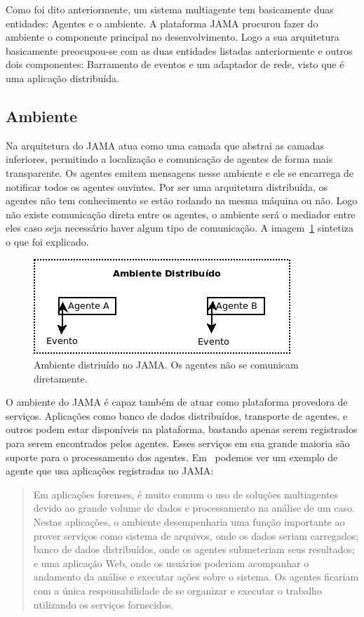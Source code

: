 Como foi dito anteriormente, um sistema multiagente tem basicamente duas entidades: Agentes e o ambiente. A plataforma JAMA procurou fazer do ambiente o componente principal no desenvolvimento. Logo a sua arquitetura basicamente preocupou-se com as duas entidades listadas anteriormente e outros dois componentes: Barramento de eventos e um adaptador de rede, visto que é uma aplicação distribuída.

\subsection{Ambiente}

Na arquitetura do JAMA atua como uma camada que abstrai as camadas inferiores, permitindo a localização e comunicação de agentes de forma mais transparente. Os agentes emitem mensagens nesse ambiente e ele se encarrega de notificar todos os agentes ouvintes. Por ser uma arquitetura distribuída, os agentes não tem conhecimento se estão rodando na mesma máquina ou não. Logo não existe comunicação direta entre os agentes, o ambiente será o mediador entre eles caso seja necessário haver algum tipo de comunicação. A imagem~\ref{fig:ambiente} sintetiza o que foi explicado.

\begin{figure}
	\includegraphics[scale=0.75]{images/ambiente.png}
	\caption{Ambiente distriuído no JAMA. Os agentes não se comunicam diretamente.}
	\label{fig:ambiente}
\end{figure}

O ambiente do JAMA é capaz também de atuar como plataforma provedora de serviços. Aplicações como banco de dados distribuídos, transporte de agentes, e outros podem estar disponíveis na plataforma, bastando apenas serem registrados para serem encontrados pelos agentes. Esses serviços em sua grande maioria são suporte para o processamento dos agentes. Em~\cite{parise11} podemos ver um exemplo de agente que usa aplicações registradas no JAMA:

\begin{quote}
Em aplicações forenses, é muito comum o uso de soluções multiagentes devido ao grande volume de dados e processamento na análise de um caso. Nestas aplicações, o ambiente desempenharia uma função importante ao prover serviços como sistema de arquivos, onde os dados seriam carregados; banco de dados distribuídos, onde os agentes submeteriam seus resultados; e uma aplicação Web, onde os usuários poderiam acompanhar o andamento da análise e executar ações sobre o sistema. Os agentes ficariam com a única responsabilidade de se organizar e executar o trabalho utilizando os serviços fornecidos.
\end{quote}

